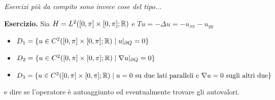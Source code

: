 \textit{Esercizi più da compito sono invece cose del tipo...}

\textbf{Esercizio.}
Sia $H = L^2([0, \pi] \times [0, \pi]; \mathbb R)$ e $T u = -\Delta u = -u_{xx} -u_{yy}$
\begin{itemize}
	\item $D_1 = \{ u \in C^2([0, \pi] \times [0, \pi]; \mathbb R) \mid u|_{\partial Q} = 0 \}$
	\item $D_2 = \{ u \in C^2([0, \pi] \times [0, \pi]; \mathbb R) \mid \nabla u|_{\partial Q} = 0 \}$
	\item $D_3 = \{ u \in C^2([0, \pi] \times [0, \pi]; \mathbb R) \mid \text{$u = 0$ su due lati paralleli e $\nabla u = 0$ sugli altri due} \}$
\end{itemize}
e dire se l'operatore è autoaggiunto ed eventualmente trovare gli autovalori.
